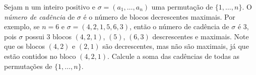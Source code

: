 Sejam n um inteiro positivo e $\sigma = (a_1, \dots, a_n)$ uma permutação de $\{1, \dots, n\}$. O \textit{número
de cadência} de $\sigma$ é o número de blocos decrescentes maximais. Por exemplo, se $n = 6$ e
$\sigma = (4, 2, 1, 5, 6, 3)$, então o número de cadência de $\sigma$ é $3$, pois $\sigma$ possui $3$ blocos $(4, 2, 1)$, $(5)$,
$(6, 3)$ descrescentes e maximais. Note que os blocos $(4, 2)$ e $(2, 1)$ são decrescentes, mas não
são maximais, já que estão contidos no bloco $(4, 2, 1)$.
Calcule a soma das cadências de todas as permutações de $\{1, \dots, n\}$.